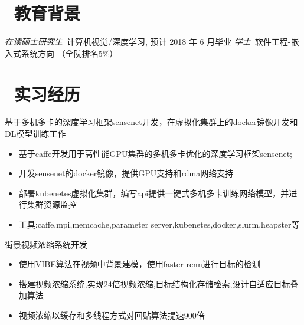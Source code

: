 \documentclass{resume}
\begin{document}


\basicInfo{
  \email{mxl.m@qq.com} \textperiodcentered\ 
  \phone{(+86) 15600519843} \textperiodcentered\ 
  \linkedin[xiaolong-ma]{https://www.linkedin.com/in/xiaolong-ma-06501bb6}}
 
\section{\faGraduationCap\ 教育背景}
\textit{在读硕士研究生}\ 计算机视觉/深度学习, 预计 2018 年 6 月毕业
\textit{学士}\ 软件工程-嵌入式系统方向 （全院排名5\%）

\section{\faUsers\ 实习经历}
\role{见习算法研究员}{部门: 算法平台部}
基于多机多卡的深度学习框架sensenet开发，在虚拟化集群上的docker镜像开发和DL模型训练工作
\begin{itemize}
  \item 基于caffe开发用于高性能GPU集群的多机多卡优化的深度学习框架sensenet;
  \item 开发sensenet的docker镜像，提供GPU支持和rdma网络支持
  \item 部署kubenetes虚拟化集群，编写api提供一键式多机多卡训练网络模型，并进行集群资源监控
  \item 工具:caffe,mpi,memcache,parameter server,kubenetes,docker,slurm,heapster等
\end{itemize}

街景视频浓缩系统开发
\begin{itemize}
  \item 使用VIBE算法在视频中背景建模，使用faster rcnn进行目标的检测
  \item 搭建视频浓缩系统,实现24倍视频浓缩,目标结构化存储检索,设计自适应目标叠加算法
  \item 视频浓缩以缓存和多线程方式对回贴算法提速900倍
\end{itemize}
\end{document}
